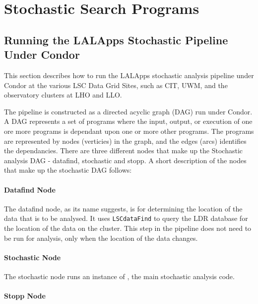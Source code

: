 
\chapter{Stochastic Search Programs}
\label{chapter:stochastic}

\clearpage


\clearpage
\section{Running the LALApps Stochastic Pipeline Under Condor}

This section describes how to run the LALApps stochastic analysis
pipeline under Condor at the various LSC Data Grid Sites, such as CIT,
UWM, and the observatory clusters at LHO and LLO.

The pipeline is constructed as a directed acyclic graph (DAG) run under
Condor. A DAG represents a set of programs where the input, output, or
execution of one ore more programs is dependant upon one or more other
programs. The programs are represented by nodes (verticies) in the
graph, and the edges (arcs) identifies the dependancies. There are three
different nodes that make up the Stochastic analysis DAG - datafind,
stochastic and stopp. A short description of the nodes that make up the
stochastic DAG follows:

\subsubsection{Datafind Node}

The datafind node, as its name suggests, is for determining the location
of the data that is to be analysed. It uses \texttt{LSCdataFind} to
query the LDR database for the location of the data on the cluster. This
step in the pipeline does not need to be run for analysis, only when the
location of the data changes.

\subsubsection{Stochastic Node}

The stochastic node runs an instance of , the
main stochastic analysis code.

\subsubsection{Stopp Node}

